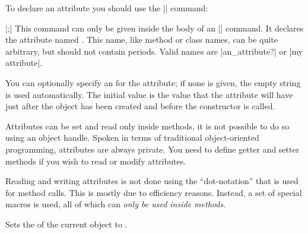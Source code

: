 To declare an attribute you should use the |\attribute| command:
\begin{command}{\attribute {}|;|}
  This command can only be given inside the body of an |\pgfooclass|
  command. It declares the attribute named . This
  name, like method or class names, can be quite arbitrary, but should
  not contain periods. Valid names are |an_attribute?| or
  |my attribute|.

  You can optionally specify an  for the
  attribute; if none is given, the empty string is used
  automatically. The initial value is the value that the attribute
  will have just after the object has been created and before the
  constructor is called.

\begin{codeexample}
\end{codeexample}
\end{command}

Attributes can be set and read only inside methods, it is not possible
to do so using an object handle. Spoken in terms of traditional
object-oriented programming, attributes are always private. You need
to define getter and setter methods if you wish to read or modify
attributes.

Reading and writing attributes is not done using the ``dot-notation''
that is used for method calls. This is mostly due to efficiency
reasons. Instead, a set of special macros is used, all of which can
\emph{only be used inside methods}.

\begin{command}{\pgfooset{}}
  Sets the  of the current object to
  .
\end{command}

